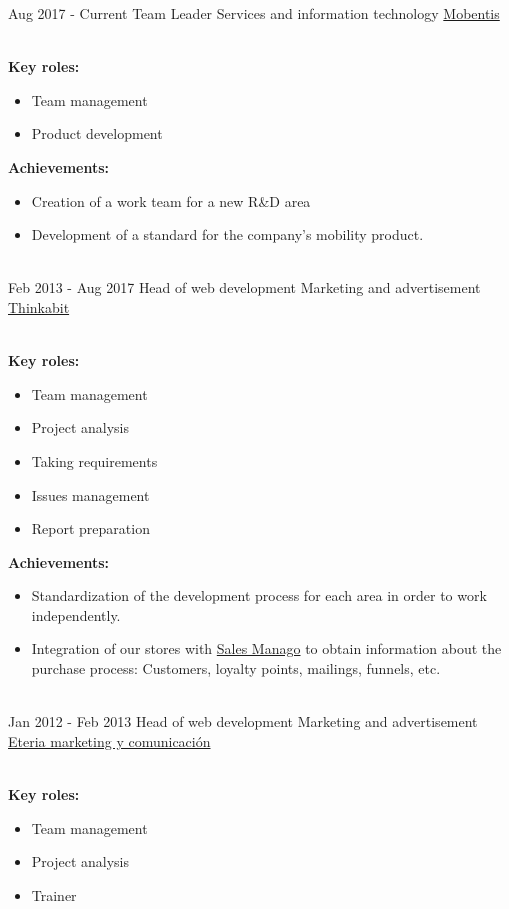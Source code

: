 \documentclass[letterpaper]{twentysecondcv} %
\begin{document}
\begin{twenty} %
	\twentyitem%
	{Aug 2017 -}
	{Current}
	{Team Leader}
	{Services and information technology}
	{\href{http://www.mobentis.com/}{Mobentis}}
	{\\
		\textbf{Key roles:}
		\begin{itemize}
			\item Team management
			\item Product development
		\end{itemize}

		\textbf{Achievements:}
		\begin{itemize}
			\item Creation of a work team for a new R\&D area
			\item Development of a standard for the company's mobility product.
		\end{itemize}
	}
	\\
    	\twentyitem%
	{Feb 2013 -}
	{Aug 2017}
	{Head of web development}
	{Marketing and advertisement}
	{\href{http://www.thinkabit.es/}{Thinkabit}}
	{\\
		\textbf{Key roles:}
		\begin{itemize}
			\item Team management
			\item Project analysis
			\item Taking requirements
			\item Issues management
			\item Report preparation
		\end{itemize}

		\textbf{Achievements:}
		\begin{itemize}
			\item Standardization of the development process for each area in order to work independently.
			\item Integration of our stores with \href{http://salesmanago.com/}{Sales Manago} to obtain information about the purchase process: Customers, loyalty points, mailings, funnels, etc.
		\end{itemize}
	}
	\\
	\twentyitem%
	{Jan 2012 -}
	{Feb 2013}
	{Head of web development}
	{Marketing and advertisement}
	{\href{http://www.eteria.es}{Eteria marketing y comunicación}}
	{\\
		\textbf{Key roles:}
		\begin{itemize}
			\item Team management
			\item Project analysis
			\item Trainer
		\end{itemize}

}
\end{twenty}
\end{document}
